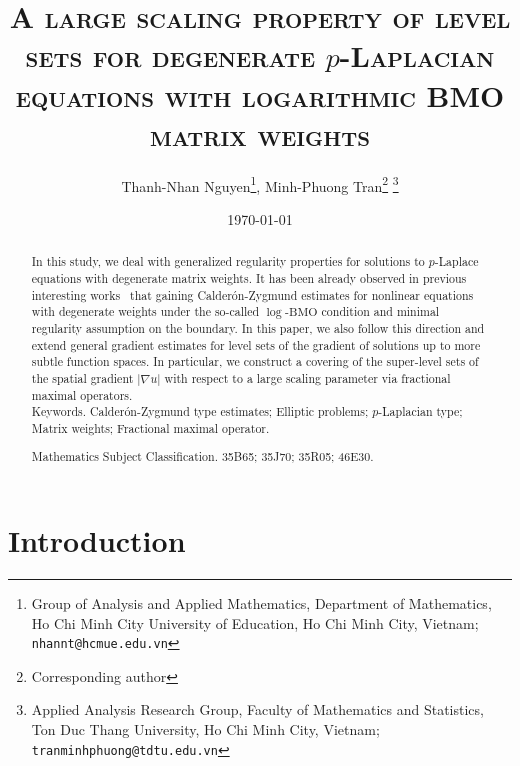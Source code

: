 \documentclass[a4paper, 11pt]{article}
\title{\textsc{A large scaling property of level sets for degenerate $p$-Laplacian equations with logarithmic BMO matrix weights}}
\author{Thanh-Nhan Nguyen\thanks{Group of Analysis and Applied Mathematics, Department of Mathematics, Ho Chi Minh City University of Education, Ho Chi Minh City, Vietnam; \texttt{nhannt@hcmue.edu.vn}}, Minh-Phuong Tran\footnote{Corresponding author} \thanks{Applied Analysis Research Group, Faculty of Mathematics and Statistics, Ton Duc Thang University, Ho Chi Minh City, Vietnam; \texttt{tranminhphuong@tdtu.edu.vn}}}
\date{\today}
\begin{document}
 
\maketitle
\begin{abstract}
In this study, we deal with generalized regularity properties for solutions to $p$-Laplace equations with degenerate matrix weights. It has been already observed in previous interesting works~\cite{BDGN2022, BBDL2023} that gaining Calder\'on-Zygmund estimates for nonlinear equations with degenerate weights under the so-called $\log$-$\mathrm{BMO}$ condition and minimal regularity assumption on the boundary. In this paper, we also follow this direction and extend general gradient estimates for level sets of the gradient of solutions up to more subtle function spaces. In particular, we construct a covering of the super-level sets of the spatial gradient $|\nabla u|$ with respect to a large scaling parameter via fractional maximal operators.\\

\noindent Keywords. Calder\'on-Zygmund type estimates; Elliptic problems; $p$-Laplacian type; Matrix weights; Fractional maximal operator.

\medskip

 Mathematics Subject Classification. 35B65; 35J70; 35R05; 46E30.
\end{abstract}

\maketitle


\section{Introduction}\label{sec:intro}
\end{document}
